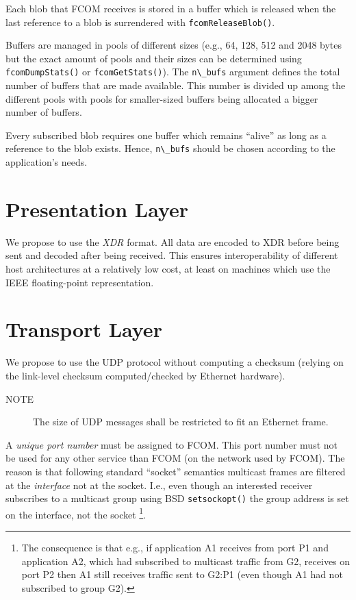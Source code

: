 \documentclass[11pt]{article}
\newcommand{\fcom}{FCOM}
\newcommand{\blob}{blob}
\newcommand{\cstl}[1]{{\lstinline+#1+}}
\newcommand{\note}[1]{
	\begin{description}
		\item[NOTE] #1
	\end{description}
}
\begin{document}
      Each \blob{} that \fcom{} receives is stored in
	  a buffer which is released when the last reference
      to a \blob{} is surrendered with \cstl{fcomReleaseBlob()}.

      Buffers are managed in pools of different sizes
      (e.g., 64, 128, 512 and 2048 bytes but the exact
      amount of pools and their sizes can be determined
      using \cstl{fcomDumpStats()} or \cstl{fcomGetStats()}).
      The \cstl{n\_bufs} argument defines the total
      number of buffers that are made available. This
      number is divided up among the different pools with
      pools for smaller-sized buffers being allocated a
      bigger number of buffers.

      Every subscribed \blob{} requires one buffer
      which remains ``alive'' as long as a reference
      to the \blob{} exists. Hence, \cstl{n\_bufs}
      should be chosen according to the application's
      needs.
     
\section{Presentation Layer}
We propose to use the {\em XDR} format. All data are encoded
to XDR before being sent and decoded after being received.
This ensures interoperability of different host architectures
at a relatively low cost, at least on machines which use the
IEEE floating-point representation.

\section{Transport Layer}
We propose to use the UDP protocol without computing a checksum
(relying on the link-level checksum computed/checked by Ethernet hardware).

\note{The size of UDP messages shall be restricted to
fit an Ethernet frame.}

A {\em unique port number} must be assigned to \fcom{}. This port
number must not be used for any other service than \fcom{}
(on the network used by \fcom{}).
The reason is that following standard ``socket'' semantics
multicast frames are filtered at the {\em interface} not at the
socket. I.e., even though an interested receiver subscribes
to a multicast group using BSD {\tt setsockopt()} the
group address is set on the interface, not the socket%
\footnote{
The consequence is that e.g., if application A1 receives
from port P1 and application A2, which
had subscribed to multicast traffic from G2, receives on
port P2 then A1 still receives traffic sent to G2:P1
(even though A1 had not subscribed to group G2).
}.
\end{document}
